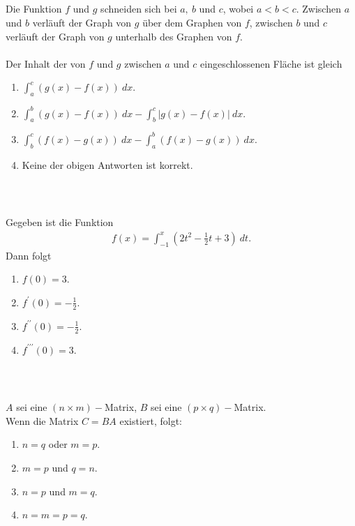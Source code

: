 \subsection*{}
Die Funktion $ f $ und $ g $ schneiden sich bei $ a,\ b $ und $ c $, wobei $ a < b < c $. Zwischen $ a $ und $ b $ verläuft der Graph von $ g $ über dem Graphen von $ f $, zwischen $ b   $ und $ c $ verläuft der Graph von $ g $ unterhalb des Graphen von $ f $.\\
\\
Der Inhalt der von $ f $ und $ g $ zwischen $ a $ und $ c $ eingeschlossenen Fläche ist gleich  
\renewcommand{\labelenumi}{(\alph{enumi})}
\begin{enumerate}
	\item 
	$ \int_a^c (g(x) - f(x)) \ dx $.
	\item
	$ \int_a^b (g(x) - f(x)) \ dx - \int_b^c |g(x) - f(x)| \ dx$.
	\item
	$ \int_b^c (f(x) - g(x)) \ dx - \int_a^b (f(x) - g(x)) \ dx$.
	\item
	Keine der obigen Antworten ist korrekt.
\end{enumerate}
\ \\
\subsection*{}
Gegeben ist die Funktion
\begin{align*}
f(x) = \int_{-1}^x \left( 2 t^2 - \frac{1}{2}t +3 \right) \ dt.
\end{align*}
Dann folgt
\renewcommand{\labelenumi}{(\alph{enumi})}
\begin{enumerate}
\item 
$ f(0) = 3 $.
\item 
$ f^\prime(0) = - \frac{1}{2} $.
\item 
$ f^{\prime \prime}(0) = - \frac{1}{2} $.
\item 
$ f^{\prime \prime \prime}(0) = 3 $.
\end{enumerate}
\ \\
\subsection*{}
$ A $ sei eine $ (n \times m )- $Matrix, $ B $ sei eine $ (p \times q)- $Matrix.\\
Wenn die Matrix $ C = BA $ existiert, folgt:
\renewcommand{\labelenumi}{(\alph{enumi})}
\begin{enumerate}
	\item 
	$ n= q $ oder $ m = p $.
	\item 
	$ m = p $ und $ q= n $.
	\item
	$ n= p $ und $ m = q $.
	\item
	$ n = m = p = q $.
\end{enumerate}
\ \\
